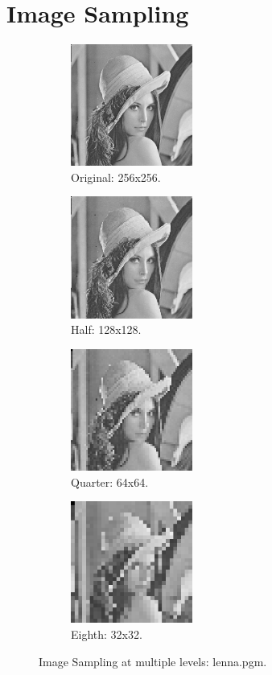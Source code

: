 \documentclass[letterpaper,10pt]{article}
\begin{document}
\section{Image Sampling}
  \begin{figure}[hbtp]
    \centering
    \begin{subfigure}{4cm}
      \includegraphics[width=4cm]{images/lenna.png}
      \caption{Original: 256x256.}
    \end{subfigure}
    \begin{subfigure}{4cm}
      \includegraphics[width=4cm]{images/lenna_subsample128.png}
      \caption{Half: 128x128.}
    \end{subfigure}
    \begin{subfigure}{4cm}
      \includegraphics[width=4cm]{images/lenna_subsample64.png}
      \caption{Quarter: 64x64.}
    \end{subfigure}
    \begin{subfigure}{4cm}
      \includegraphics[width=4cm]{images/lenna_subsample32.png}
      \caption{Eighth: 32x32.}
    \end{subfigure}
    \caption{Image Sampling at multiple levels: lenna.pgm.}
    \label{fig:samplelenna}
  \end{figure}
\end{document}
